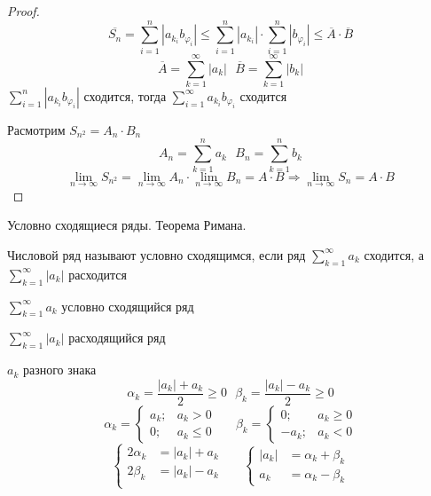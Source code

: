 \begin{proof}
  $$
  \overline{S_n} = \sum_{i=1}^n |a_{k_i} b_{\varphi_i}| \le
  \sum_{i=1}^n |a_{k_i}| \cdot \sum_{i=1}^n |b_{\varphi_i}| \le
  \overline{A} \cdot \overline{B}
  $$
  $$
  \overline{A} = \sum_{k=1}^{\infty} |a_k| ~~~
  \overline{B} = \sum_{k=1}^{\infty} |b_k|
  $$
  $\sum_{i=1}^n |a_{k_i} b_{\varphi_i}|$ сходится, тогда
  $\sum_{i=1}^{\infty} a_{k_i} b_{\varphi_i}$ сходится

  Расмотрим $S_{n^2} = A_n \cdot B_n$
  $$
  A_n = \sum_{k=1}^n a_k ~~~ B_n = \sum_{k=1}^n b_k
  $$
  $$
  \lim_{n \to \infty} S_{n^2} = \lim_{n \to \infty} A_n \cdot
  \lim_{n \to \infty} B_n = A \cdot B \Rightarrow \lim_{n \to \infty} S_n =
  A \cdot B
  $$
\end{proof}

\begin{title}
  Условно сходящиеся ряды. Теорема Римана.
\end{title}

Числовой ряд называют условно сходящимся, если ряд $\sum_{k=1}^{\infty} a_k$
сходится, а $\sum_{k=1}^{\infty} |a_k|$ расходится

\begin{block}[Свойство]
  $\sum_{k=1}^{\infty} a_k$ условно сходящийся ряд

  $\sum_{k=1}^{\infty} |a_k|$ расходящийся ряд

  $a_k$ разного знака
  $$
  \alpha_k = \frac{|a_k| + a_k}{2} \ge 0 ~~~
  \beta_k = \frac{|a_k| - a_k}{2} \ge 0
  $$
  $$
  \alpha_k =
  \left\{
  \begin{array}{ll}
    a_k; & a_k > 0 \\
    0; & a_k \le 0
  \end{array}
  \right.
  ~~~~~~~
  \beta_k =
  \left\{
  \begin{array}{ll}
    0; & a_k \ge 0 \\
    -a_k; & a_k < 0
  \end{array}
  \right.
  $$
  $$
  \left\{
  \begin{array}{ll}
    2\alpha_k & = |a_k| + a_k \\
    2\beta_k & = |a_k| - a_k \\
  \end{array}
  \right.
  ~~~~~~~
  \left\{
  \begin{array}{ll}
    |a_k| & = \alpha_k + \beta_k \\
    a_k & = \alpha_k - \beta_k
  \end{array}
  \right.
  $$
\end{block}

